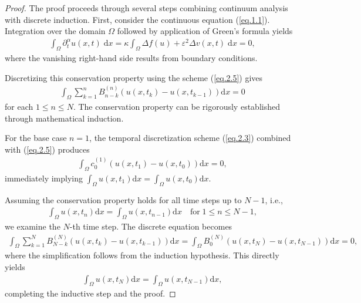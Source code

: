 \documentclass{siamart171218}
\theoremstyle{remark}
\theoremstyle{example}
\numberwithin{equation}{section}
\begin{document}
\begin{proof}
The proof proceeds through several steps combining continuum analysis with discrete induction. First, consider the continuous equation (\ref{eq.1.1}). Integration over the domain $\Omega$ followed by application of Green's formula yields
\begin{align*}
\int_\Omega \partial_t^\alpha u(x,t) \;\mathrm{d}x
= \kappa \int_\Omega \Delta f(u) +
\varepsilon^2 \Delta v(x,t)\; \mathrm{d}x = 0,
\end{align*}
where the vanishing right-hand side results from boundary conditions.

Discretizing this conservation property using the scheme (\ref{eq.2.5}) gives
\begin{align*}
\int_\Omega \sum\limits_{k=1}^{n}B_{n-k}^{(n)} \left(u(x,t_k)-u(x,t_{k-1}) \right)\mathrm{d}x = 0
\end{align*}
for each $1\leq n\leq N$. The conservation property can be rigorously established through mathematical induction.

For the base case $n=1$, the temporal discretization scheme (\ref{eq.2.3}) combined with (\ref{eq.2.5}) produces
\begin{align*}
\int_\Omega c_{0}^{(1)} \left(u(x,t_1)-u(x,t_{0}) \right)\mathrm{d}x = 0,
\end{align*}
immediately implying $\int_\Omega u(x,t_1)\mathrm{d}x = \int_\Omega u(x,t_{0}) \mathrm{d}x$.

Assuming the conservation property holds for all time steps up to $N-1$, i.e.,
\begin{align*}
\int_\Omega u(x,t_n)\mathrm{d}x = \int_\Omega u(x,t_{n-1})\mathrm{d}x \quad \text{for} \; 1\leq n\leq N-1,
\end{align*}
we examine the $N$-th time step. The discrete equation becomes
\begin{align*}
\int_\Omega \sum_{k=1}^{N} B_{N-k}^{(N)} \left(u(x,t_k)-u(x,t_{k-1}) \right)\mathrm{d}x = \int_\Omega B_{0}^{(N)} \left(u(x,t_N)-u(x,t_{N-1}) \right)\mathrm{d}x = 0,
\end{align*}
where the simplification follows from the induction hypothesis. This directly yields
\begin{align*}
\int_\Omega u(x,t_N) \mathrm{d}x = \int_\Omega u(x,t_{N-1})\mathrm{d}x,
\end{align*}
completing the inductive step and the proof.
\end{proof}
\end{document}

